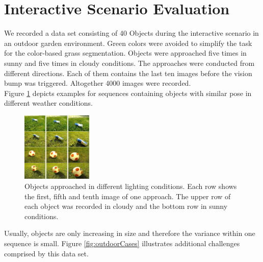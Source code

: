\documentclass[conference]{IEEEtran}
\begin{document}
\section{Interactive Scenario Evaluation}
We recorded a data set consisting of 40 Objects during the interactive scenario in an outdoor garden environment.
Green colors were avoided to simplify the task for the color-based grass segmentation. 
Objects were approached five times in sunny and five times in cloudy conditions. The approaches were conducted from different directions. 
Each of them contains the last ten images before the vision bump was triggered. 
Altogether 4000 images were recorded. \\
Figure \ref{fig:outdoorRuns} depicts examples for sequences containing objects with similar
pose in different weather conditions. 
\begin{figure}
        \centering
        \includegraphics[width=0.3\textwidth]{Images/Outdoor/Runs.jpg}
        \caption{Objects approached in different lighting conditions. 
        Each row shows the first, fifth and tenth image of one approach. 
        The upper row of each object was recorded in cloudy and the bottom row in sunny conditions.}
        \label{fig:outdoorRuns}        
\end{figure}
Usually, objects are only increasing in size and therefore the variance within one sequence is small.
Figure \ref{fig:outdoorCases} illustrates additional challenges comprised by this data set.
\end{document}
